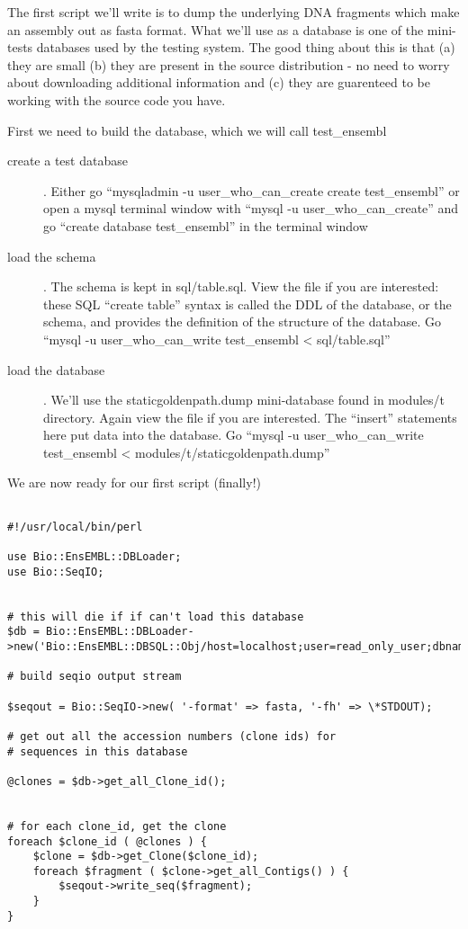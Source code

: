 \documentclass[11pt,a4paper]{article}
\begin{document}
The first script we'll write is to dump the underlying DNA fragments which make an assembly out
as fasta format. What we'll use as a database is one of the mini-tests databases used by the testing
system. The good thing about this is that (a) they are small (b) they are present in the source
distribution - no need to worry about downloading additional information and (c) they are guarenteed
to be working with the source code you have.

First we need to build the database, which we will call test\_ensembl

\begin{description}
\item[create a test database]. Either go ``mysqladmin -u user\_who\_can\_create create test\_ensembl'' or open
a mysql terminal window with ``mysql -u user\_who\_can\_create'' and go ``create database test\_ensembl''
in the terminal window
\item[load the schema]. The schema is kept in sql/table.sql. View the file if you are interested:
these SQL ``create table'' syntax is called the DDL of the database, or the schema, and provides the 
definition of the structure of the database. Go ``mysql -u user\_who\_can\_write test\_ensembl < sql/table.sql''
\item[load the database]. We'll use the staticgoldenpath.dump mini-database found in modules/t directory.
Again view the file if you are interested. The ``insert'' statements here put data into the database. Go
``mysql -u user\_who\_can\_write test\_ensembl < modules/t/staticgoldenpath.dump''
\end{description}

We are now ready for our first script (finally!)

\begin{verbatim}

#!/usr/local/bin/perl

use Bio::EnsEMBL::DBLoader;
use Bio::SeqIO;


# this will die if if can't load this database
$db = Bio::EnsEMBL::DBLoader->new('Bio::EnsEMBL::DBSQL::Obj/host=localhost;user=read_only_user;dbname=test_ensembl');

# build seqio output stream

$seqout = Bio::SeqIO->new( '-format' => fasta, '-fh' => \*STDOUT);

# get out all the accession numbers (clone ids) for
# sequences in this database

@clones = $db->get_all_Clone_id();


# for each clone_id, get the clone
foreach $clone_id ( @clones ) {
	$clone = $db->get_Clone($clone_id);
	foreach $fragment ( $clone->get_all_Contigs() ) {
		$seqout->write_seq($fragment);
   	}
}

\end{verbatim}
\end{document}

